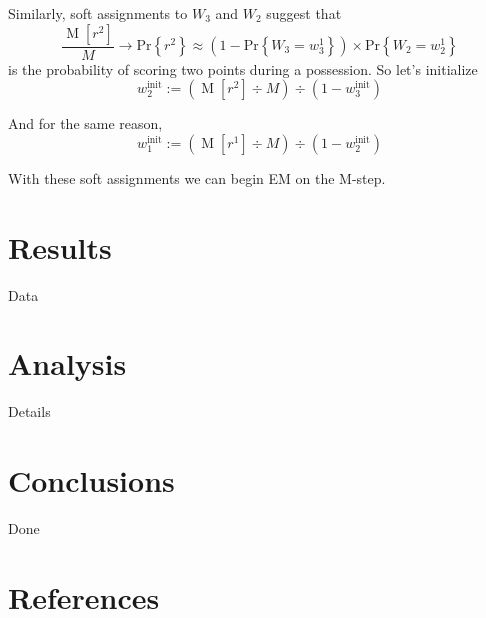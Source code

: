 \documentclass[10pt,twocolumn]{article}
\newcommand{\prb}[1]{\ensuremath{  \mathrm{Pr}\left\{ #1 \right\}  }}
\begin{document}
Similarly, soft assignments to $W_3$ and $W_2$ suggest that
\[
\frac{ \operatorname{M}\left[ r^2 \right] }{ M } \to \prb{r^2} \approx \left(1 - \prb{W_3 = w_3^1}\right) \times \prb{W_2 = w_2^1}
\]%
is the probability of scoring two points during a possession. So let's initialize
\[
w_2^{\mathrm{init}} := \left( \operatorname{M}\left[ r^2 \right] \div  M \right) \div \left( 1 - w_3^{\mathrm{init}} \right) 
\]%

And for the same reason,
\[
w_1^{\mathrm{init}} := \left( \operatorname{M}\left[ r^1 \right] \div  M \right) \div \left( 1 - w_2^{\mathrm{init}} \right) 
\]%

With these soft assignments we can begin EM on the M-step.


\section{Results}

Data

\section{Analysis}

Details

\section{Conclusions}

Done


\section{References}


%
\end{document}
